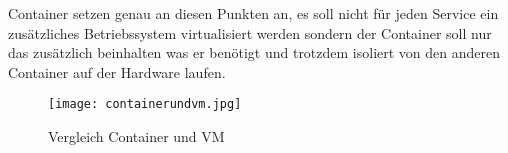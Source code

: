 Container setzen genau an diesen Punkten an, es soll nicht für jeden Service ein zusätzliches Betriebssystem virtualisiert werden sondern der Container soll nur das zusätzlich beinhalten was er benötigt und trotzdem isoliert von den anderen Container auf der Hardware laufen.\cite{12005068320161201}\cite{redhat}
\begin{figure}[H]
	\begin{center}
		\texttt{[image: containerundvm.jpg]}
	\end{center}
	\caption[Vergleich Container und VM]{Vergleich Container und VM \footnotemark}
	\label{fig:HW1}
\end{figure}

